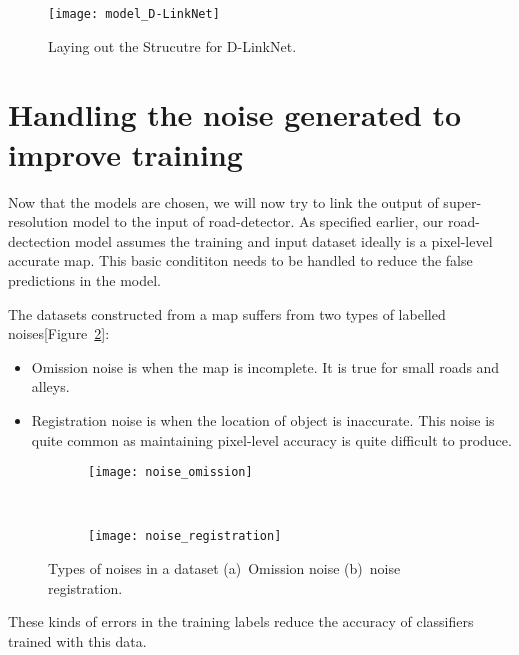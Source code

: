 \begin{figure}[t]
  \centering
  \texttt{[image: model\_D-LinkNet]}
  \caption{Laying out the Strucutre for D-LinkNet\cite{D-LinkNet}.}
  \label{fig:model_D-LinkNet}
\end{figure}


\section{Handling the noise generated to improve training}
Now that the models are chosen, we will now try to link the output of super-resolution model to the input of road-detector. As specified earlier, our road-dectection model assumes the training and input dataset ideally is a pixel-level accurate map. This basic condititon needs to be handled to reduce the false predictions in the model. \par

The datasets constructed from a map suffers from two types of labelled noises[Figure~\ref{fig:noise_types}]:
\begin{itemize}
  \item Omission noise is when the map is incomplete. It is true for small roads and alleys.
  \item Registration noise is when the location of object is inaccurate. This noise is quite common as maintaining pixel-level accuracy is quite difficult to produce.
\end{itemize}

\begin{figure}
  \centering
  \begin{subfigure}{0.5\textwidth}
    \texttt{[image: noise\_omission]}
    \caption{}
  \end{subfigure}~
  \begin{subfigure}{0.5\textwidth}
    \texttt{[image: noise\_registration]}
    \caption{}
  \end{subfigure}
  \caption[Types of noises in a dataset]{Types of noises in a dataset (a)~Omission noise (b)~noise registration.}%
  \label{fig:noise_types}%
\end{figure}

These kinds of errors in the training labels reduce the accuracy of classifiers trained with this data. 


